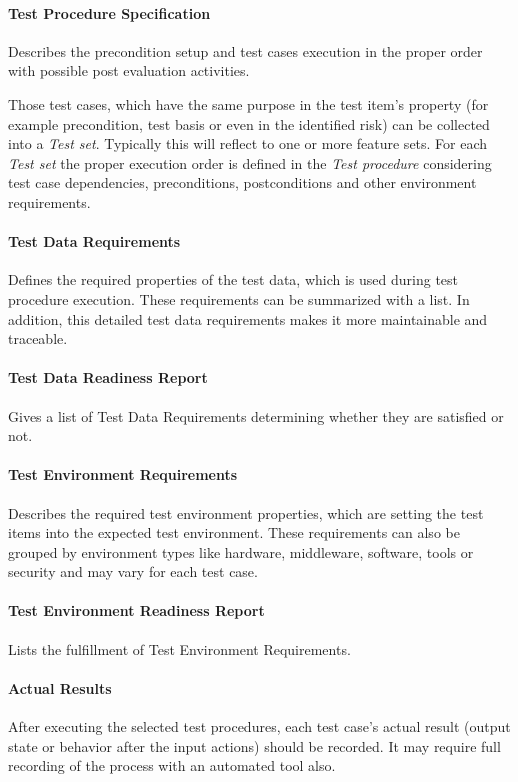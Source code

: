 \paragraph{Test Procedure Specification}
Describes the precondition setup and test cases execution in the proper order with possible post evaluation activities.

Those test cases, which have the same purpose in the test item's property (for example precondition, test basis or even in the identified risk) can be collected into a \textit{Test set}. Typically this will reflect to one or more feature sets. For each \textit{Test set} the proper execution order is defined in the \textit{Test procedure} considering test case dependencies, preconditions, postconditions and other environment requirements.

\paragraph{Test Data Requirements}
Defines the required properties of the test data, which is used during test procedure execution. These requirements can be summarized with a list. In addition, this detailed test data requirements makes it more maintainable and traceable. 

\paragraph{Test Data Readiness Report} 
Gives a list of Test Data Requirements determining whether they are satisfied or not.

\paragraph{Test Environment Requirements}
Describes the required test environment properties, which are setting the test items into the expected test environment. These requirements can also be grouped by environment types like hardware, middleware, software, tools or security and may vary for each test case.

\paragraph{Test Environment Readiness Report}
Lists the fulfillment of Test Environment Requirements.

\paragraph{Actual Results}
After executing the selected test procedures, each test case's actual result (output state or behavior after the input actions) should be recorded. It may require full recording of the process with an automated tool also.

